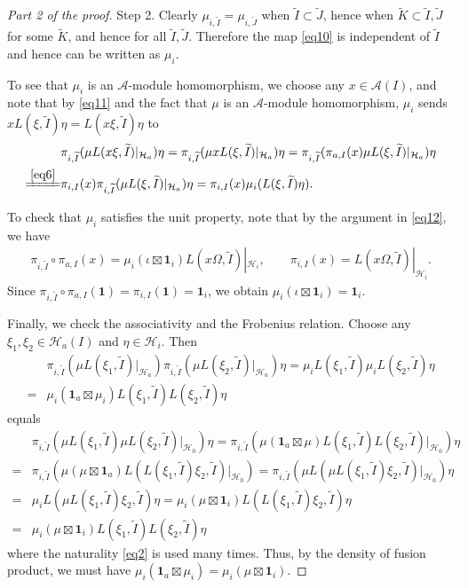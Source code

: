 \documentclass[11pt,b5paper,notitlepage]{article}
\theoremstyle{definition}
\theoremstyle{plain}
\newcommand{\mc}{\mathcal}
\newcommand{\wtd}{\widetilde}
\newcommand{\id}{\mathbf{1}}
\numberwithin{equation}{section}
\begin{document}
\begin{proof}[Part 2 of the proof]
Step 2. Clearly $\mu_{i,\wtd I}=\mu_{i,\wtd J}$ when $\wtd I\subset \wtd J$, hence when $\wtd K\subset\wtd I,\wtd J$ for some $\wtd K$, and hence for all $\wtd I,\wtd J$. Therefore the map \eqref{eq10} is independent of  $\wtd I$ and hence can be written as $\mu_{i}$.

To see that $\mu_i$ is an $\mc A$-module homomorphism, we choose any $x\in\mc A(I)$, and note that by \eqref{eq11} and the fact that $\mu$ is an $\mc A$-module homomorphism, $\mu_i$ sends $xL(\xi,\wtd I)\eta=L(x\xi,\wtd I)\eta$ to
\begin{align*}
&\pi_{i,\wtd I}(\mu L(x\xi,\wtd I)|_{\mc H_a})\eta=\pi_{i,\wtd I}(\mu xL(\xi,\wtd I)|_{\mc H_a})\eta=\pi_{i,\wtd I}(\pi_{a,I}(x)\mu L(\xi,\wtd I)|_{\mc H_a})\eta\\
\xlongequal{\eqref{eq6}}&\pi_{i,I}(x)\pi_{i,\wtd I}(\mu L(\xi,\wtd I)|_{\mc H_a})\eta=\pi_{i,I}(x)\mu_i(L(\xi,\wtd I)\eta).
\end{align*}

To check that $\mu_i$ satisfies the unit property, note that by the argument in \eqref{eq12}, we have
\begin{align*}
\pi_{i,\wtd I}\circ\pi_{a,I}(x)=\mu_i(\iota\boxtimes \id_i) L(x\Omega,\wtd I)|_{\mc H_i},\qquad \pi_{i,I}(x)=L(x\Omega,\wtd I)|_{\mc H_i}.
\end{align*}
Since $\pi_{i,\wtd I}\circ\pi_{a,I}(\id)=\pi_{i,I}(\id)=\id_i$, we obtain $\mu_i(\iota\boxtimes \id_i)=\id_i$.


Finally, we check the associativity and the Frobenius relation. Choose any $\xi_1,\xi_2\in\mc H_a(I)$ and $\eta\in\mc H_i$. Then
\begin{align*}
&\pi_{i,\wtd I}(\mu L(\xi_1,\wtd I)|_{\mc H_a})\pi_{i,\wtd I}(\mu L(\xi_2,\wtd I)|_{\mc H_a})\eta=\mu_i L(\xi_1,\wtd I)\mu_i L(\xi_2,\wtd I)\eta\\
=&\mu_i(\id_a\boxtimes\mu_i)L(\xi_1,\wtd I)L(\xi_2,\wtd I)\eta	
\end{align*}
equals
\begin{align*}
&\pi_{i,\wtd I}(\mu L(\xi_1,\wtd I)\mu L(\xi_2,\wtd I)|_{\mc H_0})\eta=\pi_{i,\wtd I}(\mu(\id_a\boxtimes\mu) L(\xi_1,\wtd I) L(\xi_2,\wtd I)|_{\mc H_0})\eta\\
=& \pi_{i,\wtd I}(\mu(\mu\boxtimes\id_a) L(L(\xi_1,\wtd I)\xi_2,\wtd I)|_{\mc H_0})	=\pi_{i,\wtd I}(\mu L(\mu L(\xi_1,\wtd I)\xi_2,\wtd I)|_{\mc H_0})\eta\\
=&\mu_i L(\mu L(\xi_1,\wtd I)\xi_2,\wtd I)\eta=\mu_i(\mu\boxtimes \id_i) L(L(\xi_1,\wtd I)\xi_2,\wtd I)\eta\\
=&\mu_i(\mu\boxtimes \id_i) L(\xi_1,\wtd I)L(\xi_2,\wtd I)\eta
\end{align*}
where the naturality \eqref{eq2} is used many times. Thus, by the density of fusion product, we must have $\mu_i(\id_a\boxtimes\mu_i)=\mu_i(\mu\boxtimes\id_i)$.


\end{proof}
\end{document}
